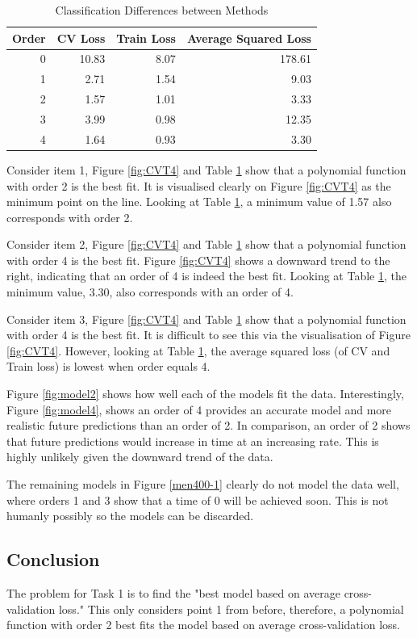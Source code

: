 {{	\begin{table}[h]
		\centering
		\caption{Classification Differences between Methods}
		\label{t:ModLoss}
		\begin{tabular}{rrrr}
			\hline
			\textbf{Order} & \textbf{CV Loss} & \textbf{Train Loss} & \textbf{Average Squared Loss} \\ \hline
			0 & 10.83 & 8.07 & 178.61 \\
			1 & 2.71 & 1.54 & 9.03 \\
			2 & 1.57 & 1.01 & 3.33 \\
			3 & 3.99 & 0.98 & 12.35 \\
			4 & 1.64 & 0.93 & 3.30
		\end{tabular}
	\end{table}
	
	Consider item 1, Figure \ref{fig:CVT4} and Table \ref{t:ModLoss} show that a polynomial function with order 2 is the best fit. It is visualised clearly on Figure \ref{fig:CVT4} as the minimum point on the line. Looking at Table \ref{t:ModLoss}, a minimum value of 1.57 also corresponds with order 2.
	
	Consider item 2, Figure \ref{fig:CVT4} and Table \ref{t:ModLoss} show that a polynomial function with order 4 is the best fit. Figure \ref{fig:CVT4} shows a downward trend to the right, indicating that an order of 4 is indeed the best fit. Looking at Table \ref{t:ModLoss}, the minimum value, 3.30, also corresponds with an order of 4.
	
	Consider item 3, Figure \ref{fig:CVT4} and Table \ref{t:ModLoss} show that a polynomial function with order 4 is the best fit. It is difficult to see this via the visualisation of Figure \ref{fig:CVT4}. However, looking at Table \ref{t:ModLoss}, the average squared loss (of CV and Train loss) is lowest when order equals 4. 
	
	Figure \ref{fig:model2} shows how well each of the models fit the data. Interestingly, Figure \ref{fig:model4}, shows an order of 4 provides an accurate model and more realistic future predictions than an order of 2. In comparison, an order of 2 shows that future predictions would increase in time at an increasing rate. This is highly unlikely given the downward trend of the data.
	
	The remaining models in Figure \ref{men400-1} clearly do not model the data well, where orders 1 and 3 show that a time of 0 will be achieved soon. This is not humanly possibly so the models can be discarded. 
	
	\subsection{Conclusion}
	The problem for Task 1 is to find the "best model based on average cross-validation loss." This only considers point 1 from before, therefore, a polynomial function with order 2 best fits the model based on average cross-validation loss.
	
}}

